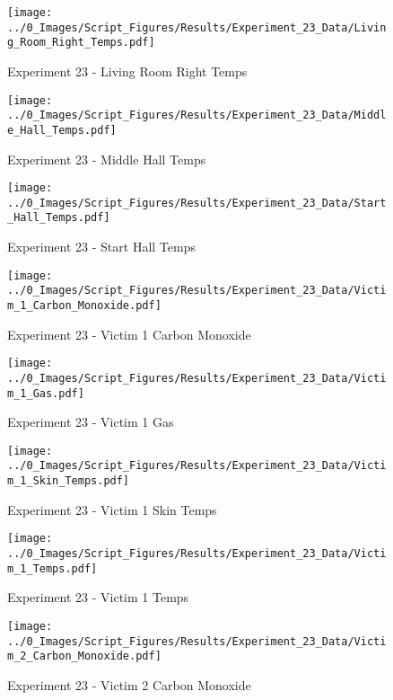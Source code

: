 	\clearpage

	\begin{figure}[H]
		\centering
		\texttt{[image: ../0\_Images/Script\_Figures/Results/Experiment\_23\_Data/Living\_Room\_Right\_Temps.pdf]}
		\caption[]{Experiment 23 - Living Room Right Temps}
	\end{figure}
 

	\begin{figure}[H]
		\centering
		\texttt{[image: ../0\_Images/Script\_Figures/Results/Experiment\_23\_Data/Middle\_Hall\_Temps.pdf]}
		\caption[]{Experiment 23 - Middle Hall Temps}
	\end{figure}
 
	\clearpage

	\begin{figure}[H]
		\centering
		\texttt{[image: ../0\_Images/Script\_Figures/Results/Experiment\_23\_Data/Start\_Hall\_Temps.pdf]}
		\caption[]{Experiment 23 - Start Hall Temps}
	\end{figure}
 

	\begin{figure}[H]
		\centering
		\texttt{[image: ../0\_Images/Script\_Figures/Results/Experiment\_23\_Data/Victim\_1\_Carbon\_Monoxide.pdf]}
		\caption[]{Experiment 23 - Victim 1 Carbon Monoxide}
	\end{figure}
 
	\clearpage

	\begin{figure}[H]
		\centering
		\texttt{[image: ../0\_Images/Script\_Figures/Results/Experiment\_23\_Data/Victim\_1\_Gas.pdf]}
		\caption[]{Experiment 23 - Victim 1 Gas}
	\end{figure}
 

	\begin{figure}[H]
		\centering
		\texttt{[image: ../0\_Images/Script\_Figures/Results/Experiment\_23\_Data/Victim\_1\_Skin\_Temps.pdf]}
		\caption[]{Experiment 23 - Victim 1 Skin Temps}
	\end{figure}
 
	\clearpage

	\begin{figure}[H]
		\centering
		\texttt{[image: ../0\_Images/Script\_Figures/Results/Experiment\_23\_Data/Victim\_1\_Temps.pdf]}
		\caption[]{Experiment 23 - Victim 1 Temps}
	\end{figure}
 

	\begin{figure}[H]
		\centering
		\texttt{[image: ../0\_Images/Script\_Figures/Results/Experiment\_23\_Data/Victim\_2\_Carbon\_Monoxide.pdf]}
		\caption[]{Experiment 23 - Victim 2 Carbon Monoxide}
	\end{figure}
 
